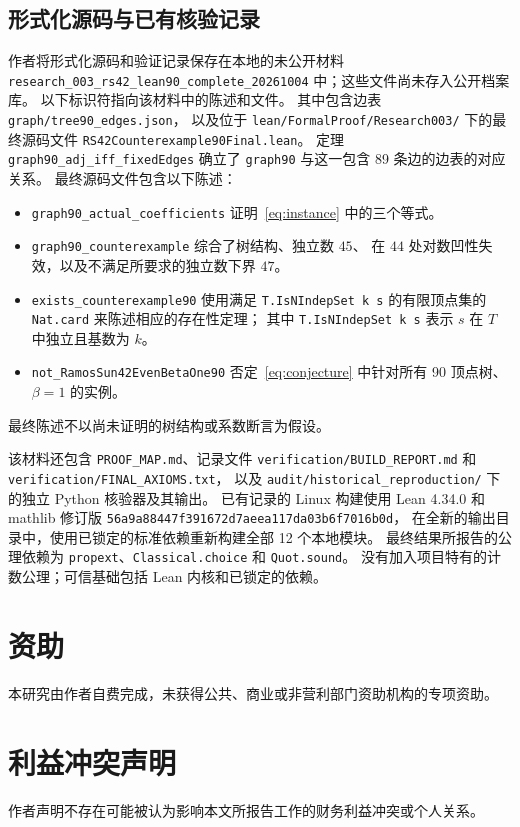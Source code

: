 \documentclass[UTF8,11pt,a4paper,fontset=fandol]{ctexart}
\theoremstyle{remark}
\numberwithin{equation}{section}
\begin{document}
\subsection{形式化源码与已有核验记录}\label{app:formal-record}

作者将形式化源码和验证记录保存在本地的未公开材料
\nolinkurl{research_003_rs42_lean90_complete_20261004} 中；这些文件尚未存入公开档案库。
以下标识符指向该材料中的陈述和文件。
其中包含边表 \nolinkurl{graph/tree90_edges.json}，
以及位于 \nolinkurl{lean/FormalProof/Research003/} 下的最终源码文件
\nolinkurl{RS42Counterexample90Final.lean}。
定理 \nolinkurl{graph90_adj_iff_fixedEdges} 确立了
\nolinkurl{graph90} 与这一包含 89 条边的边表的对应关系。
最终源码文件包含以下陈述：
\begin{itemize}
\item \nolinkurl{graph90_actual_coefficients} 证明~\eqref{eq:instance} 中的三个等式。
\item \nolinkurl{graph90_counterexample} 综合了树结构、独立数 $45$、
在 $44$ 处对数凹性失效，以及不满足所要求的独立数下界 $47$。
\item \nolinkurl{exists_counterexample90} 使用满足 \texttt{T.IsNIndepSet k s}
的有限顶点集的 \nolinkurl{Nat.card} 来陈述相应的存在性定理；
其中 \texttt{T.IsNIndepSet k s} 表示 $s$ 在 $T$ 中独立且基数为 $k$。
\item \nolinkurl{not_RamosSun42EvenBetaOne90} 否定~\eqref{eq:conjecture}
中针对所有 90 顶点树、$\beta=1$ 的实例。
\end{itemize}
最终陈述不以尚未证明的树结构或系数断言为假设。

该材料还包含 \nolinkurl{PROOF_MAP.md}、记录文件
\nolinkurl{verification/BUILD_REPORT.md} 和
\nolinkurl{verification/FINAL_AXIOMS.txt}，
以及 \nolinkurl{audit/historical_reproduction/} 下的独立 Python 核验器及其输出。
已有记录的 Linux 构建使用 Lean 4.34.0 和 mathlib 修订版
\nolinkurl{56a9a88447f391672d7aeea117da03b6f7016b0d}，
在全新的输出目录中，使用已锁定的标准依赖重新构建全部 12 个本地模块。
最终结果所报告的公理依赖为 \nolinkurl{propext}、\nolinkurl{Classical.choice}
和 \nolinkurl{Quot.sound}。
没有加入项目特有的计数公理；可信基础包括 Lean 内核和已锁定的依赖。

\section*{资助}
本研究由作者自费完成，未获得公共、商业或非营利部门资助机构的专项资助。

\section*{利益冲突声明}
作者声明不存在可能被认为影响本文所报告工作的财务利益冲突或个人关系。
\end{document}
